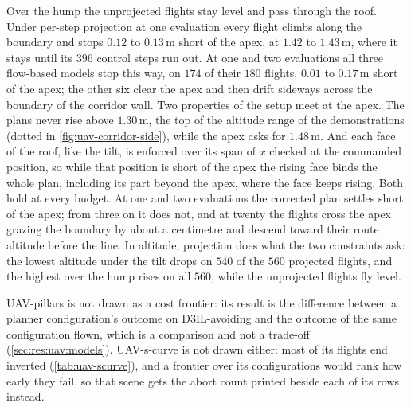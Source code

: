 Over the hump the unprojected flights stay level and pass through the roof. Under per-step projection at one
evaluation every flight climbs along the boundary and stops $0.12$ to $0.13$\,m short of the apex, at
$1.42$ to $1.43$\,m, where it stays until its $396$ control steps run out. At one and two evaluations
all three flow-based models stop this way, on $174$ of their $180$ flights, $0.01$ to $0.17$\,m short of
the apex; the other six clear the apex and then drift sideways across the boundary of the corridor wall.
Two properties of the setup meet at the apex. The plans never rise above $1.30$\,m, the top of the
altitude range of the demonstrations (dotted in \autoref{fig:uav-corridor-side}), while the apex asks for
$1.48$\,m. And each face of the roof, like the tilt, is enforced over its span of $x$ checked at the
commanded position, so while that position is short of the apex the rising face binds the whole plan,
including its part beyond the apex, where the face keeps rising. Both hold at every budget. At one and
two evaluations the corrected plan settles short of the apex; from three on it does not, and at twenty
the flights cross the apex grazing the boundary by about a centimetre and descend toward their route
altitude before the line. In altitude, projection does what the two constraints ask: the lowest altitude
under the tilt drops on $540$ of the $560$ projected flights, and the highest over the hump rises on all
$560$, while the unprojected flights fly level.

UAV-pillars is not drawn as a cost frontier: its result is the difference between a planner configuration's outcome on
D3IL-avoiding and the outcome of the same configuration flown, which is a comparison and not a trade-off
(\autoref{sec:res:uav:models}). UAV-s-curve is not drawn either: most of its flights end inverted
(\autoref{tab:uav-scurve}), and a frontier over its configurations would rank how early they fail, so that
scene gets the abort count printed beside each of its rows instead.

\FloatBarrier
